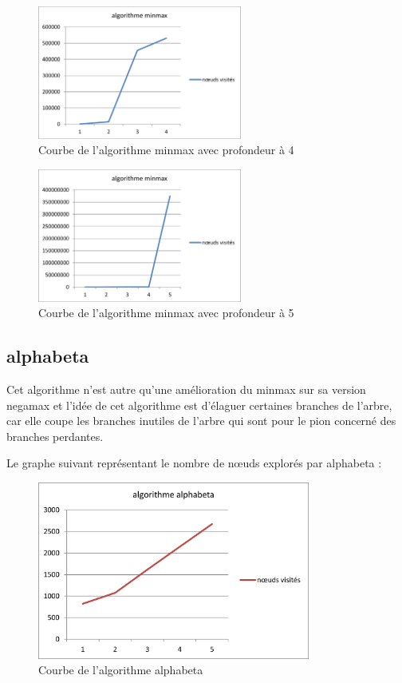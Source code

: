 \documentclass[11pt, pdflatex]{report}
\begin{document}
\begin{figure}[H]
    \centering
    \includegraphics[width=0.6\textwidth]{minmax1.png}
    \caption{Courbe de l'algorithme minmax avec profondeur à 4}
\end{figure}

\begin{figure}[H]
    \centering
    \includegraphics[width=0.6\textwidth]{minmax2.png}
    \caption{Courbe de l'algorithme minmax avec profondeur à 5}
\end{figure}

\newpage
\subsection{alphabeta}
Cet algorithme n’est autre qu’une amélioration du minmax sur sa version negamax et l’idée de cet algorithme est d’élaguer certaines branches de l’arbre, car elle coupe les branches inutiles de l’arbre qui sont pour le pion concerné des branches perdantes.\par
Le graphe suivant représentant le nombre de nœuds explorés par alphabeta :\par

\begin{figure}[H]
    \centering
    \includegraphics[width=0.8\textwidth]{alphabeta.png}
    \caption{Courbe de l'algorithme alphabeta}
\end{figure}
\end{document}
